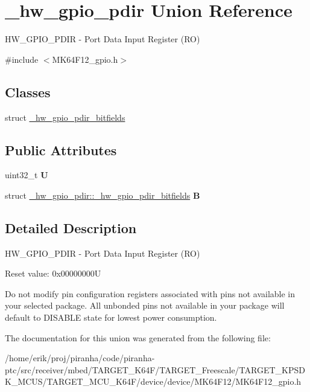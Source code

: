 \hypertarget{union__hw__gpio__pdir}{}\section{\+\_\+hw\+\_\+gpio\+\_\+pdir Union Reference}
\label{union__hw__gpio__pdir}


H\+W\+\_\+\+G\+P\+I\+O\+\_\+\+P\+D\+IR -\/ Port Data Input Register (RO)  




{\ttfamily \#include $<$M\+K64\+F12\+\_\+gpio.\+h$>$}

\subsection*{Classes}
\begin{DoxyCompactItemize}
\item 
struct \hyperlink{struct__hw__gpio__pdir_1_1__hw__gpio__pdir__bitfields}{\+\_\+hw\+\_\+gpio\+\_\+pdir\+\_\+bitfields}
\end{DoxyCompactItemize}
\subsection*{Public Attributes}
\begin{DoxyCompactItemize}
\item 
uint32\+\_\+t {\bfseries U}\hypertarget{union__hw__gpio__pdir_ad2496c23ec82ad606c2219ee898e7613}{}\label{union__hw__gpio__pdir_ad2496c23ec82ad606c2219ee898e7613}

\item 
struct \hyperlink{struct__hw__gpio__pdir_1_1__hw__gpio__pdir__bitfields}{\+\_\+hw\+\_\+gpio\+\_\+pdir\+::\+\_\+hw\+\_\+gpio\+\_\+pdir\+\_\+bitfields} {\bfseries B}\hypertarget{union__hw__gpio__pdir_acc902cf744194c3303ba22640057c955}{}\label{union__hw__gpio__pdir_acc902cf744194c3303ba22640057c955}

\end{DoxyCompactItemize}


\subsection{Detailed Description}
H\+W\+\_\+\+G\+P\+I\+O\+\_\+\+P\+D\+IR -\/ Port Data Input Register (RO) 

Reset value\+: 0x00000000U

Do not modify pin configuration registers associated with pins not available in your selected package. All unbonded pins not available in your package will default to D\+I\+S\+A\+B\+LE state for lowest power consumption. 

The documentation for this union was generated from the following file\+:\begin{DoxyCompactItemize}
\item 
/home/erik/proj/piranha/code/piranha-\/ptc/src/receiver/mbed/\+T\+A\+R\+G\+E\+T\+\_\+\+K64\+F/\+T\+A\+R\+G\+E\+T\+\_\+\+Freescale/\+T\+A\+R\+G\+E\+T\+\_\+\+K\+P\+S\+D\+K\+\_\+\+M\+C\+U\+S/\+T\+A\+R\+G\+E\+T\+\_\+\+M\+C\+U\+\_\+\+K64\+F/device/device/\+M\+K64\+F12/M\+K64\+F12\+\_\+gpio.\+h\end{DoxyCompactItemize}
